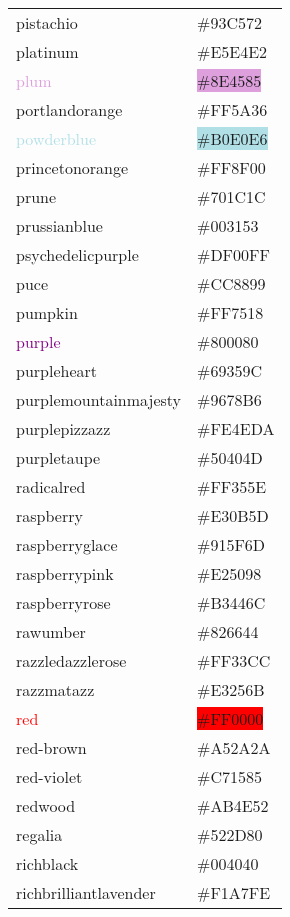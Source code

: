 \documentclass[
]{article}
\begin{document}
\begin{longtable}[]{@{}ll@{}}
\textcolor{pistachio}{pistachio} &
\colorbox{pistachio}{\#93C572}\tabularnewline
\textcolor{platinum}{platinum} &
\colorbox{platinum}{\#E5E4E2}\tabularnewline
\textcolor{plum}{plum} & \colorbox{plum}{\#8E4585}\tabularnewline
\textcolor{portlandorange}{portlandorange} &
\colorbox{portlandorange}{\#FF5A36}\tabularnewline
\textcolor{powderblue}{powderblue} &
\colorbox{powderblue}{\#B0E0E6}\tabularnewline
\textcolor{princetonorange}{princetonorange} &
\colorbox{princetonorange}{\#FF8F00}\tabularnewline
\textcolor{prune}{prune} &
\colorbox{persianplum}{\#701C1C}\tabularnewline
\textcolor{prussianblue}{prussianblue} &
\colorbox{prussianblue}{\#003153}\tabularnewline
\textcolor{psychedelicpurple}{psychedelicpurple} &
\colorbox{phlox}{\#DF00FF}\tabularnewline
\textcolor{puce}{puce} & \colorbox{puce}{\#CC8899}\tabularnewline
\textcolor{pumpkin}{pumpkin} &
\colorbox{pumpkin}{\#FF7518}\tabularnewline
\textcolor{purple}{purple} &
\colorbox{patriarch}{\#800080}\tabularnewline
\textcolor{purpleheart}{purpleheart} &
\colorbox{purpleheart}{\#69359C}\tabularnewline
\textcolor{purplemountainmajesty}{purplemountainmajesty} &
\colorbox{purplemountainmajesty}{\#9678B6}\tabularnewline
\textcolor{purplepizzazz}{purplepizzazz} &
\colorbox{purplepizzazz}{\#FE4EDA}\tabularnewline
\textcolor{purpletaupe}{purpletaupe} &
\colorbox{purpletaupe}{\#50404D}\tabularnewline
\textcolor{radicalred}{radicalred} &
\colorbox{radicalred}{\#FF355E}\tabularnewline
\textcolor{raspberry}{raspberry} &
\colorbox{raspberry}{\#E30B5D}\tabularnewline
\textcolor{raspberryglace}{raspberryglace} &
\colorbox{mauvetaupe}{\#915F6D}\tabularnewline
\textcolor{raspberrypink}{raspberrypink} &
\colorbox{raspberrypink}{\#E25098}\tabularnewline
\textcolor{raspberryrose}{raspberryrose} &
\colorbox{raspberryrose}{\#B3446C}\tabularnewline
\textcolor{rawumber}{rawumber} &
\colorbox{rawumber}{\#826644}\tabularnewline
\textcolor{razzledazzlerose}{razzledazzlerose} &
\colorbox{razzledazzlerose}{\#FF33CC}\tabularnewline
\textcolor{razzmatazz}{razzmatazz} &
\colorbox{razzmatazz}{\#E3256B}\tabularnewline
\textcolor{red}{red} & \colorbox{red}{\#FF0000}\tabularnewline
\textcolor{red-brown}{red-brown} &
\colorbox{red-brown}{\#A52A2A}\tabularnewline
\textcolor{red-violet}{red-violet} &
\colorbox{mediumviolet-red}{\#C71585}\tabularnewline
\textcolor{redwood}{redwood} &
\colorbox{redwood}{\#AB4E52}\tabularnewline
\textcolor{regalia}{regalia} &
\colorbox{regalia}{\#522D80}\tabularnewline
\textcolor{richblack}{richblack} &
\colorbox{richblack}{\#004040}\tabularnewline
\textcolor{richbrilliantlavender}{richbrilliantlavender} &
\colorbox{richbrilliantlavender}{\#F1A7FE}\tabularnewline

\end{longtable}
\end{document}
